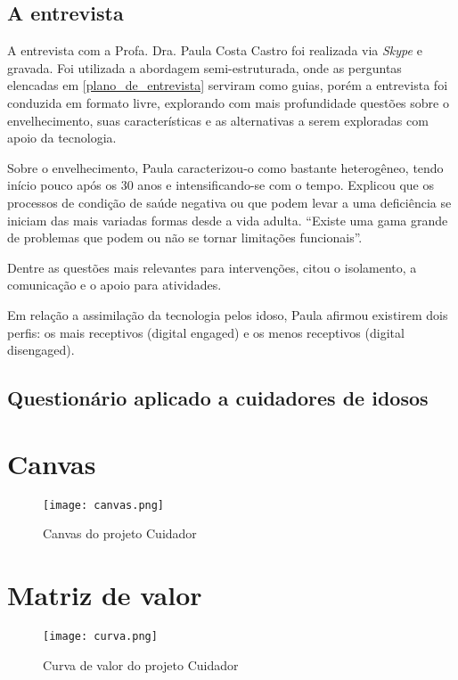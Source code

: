 \subsection{A entrevista}

A entrevista com a Profa. Dra. Paula Costa Castro foi realizada via \emph{Skype} e gravada. Foi utilizada a abordagem semi-estruturada, onde as perguntas elencadas em \ref{plano_de_entrevista} serviram como guias, porém a entrevista foi conduzida em formato livre, explorando com mais profundidade questões sobre o envelhecimento, suas características e as alternativas a serem exploradas com apoio da tecnologia.

Sobre o envelhecimento, Paula caracterizou-o como bastante heterogêneo, tendo início pouco após os 30 anos e intensificando-se com o tempo. Explicou que os processos de condição de saúde negativa ou que podem levar a uma deficiência se iniciam das mais variadas formas desde a vida adulta. “Existe uma gama grande de problemas que podem ou não se tornar limitações funcionais”.

Dentre as questões mais relevantes para intervenções, citou o isolamento, a comunicação e o apoio para atividades.

Em relação a assimilação da tecnologia pelos idoso, Paula afirmou existirem dois perfis: os mais receptivos (digital engaged) e os menos receptivos (digital disengaged). 


\subsection{Questionário aplicado a cuidadores de idosos}

\section{Canvas}

\begin{figure}[h]
\centering
\texttt{[image: canvas.png]}
\caption{Canvas do projeto Cuidador}
\end{figure}


\section{Matriz de valor}

\begin{figure}[h]
\centering
\texttt{[image: curva.png]}
\caption{Curva de valor do projeto Cuidador}
\end{figure}